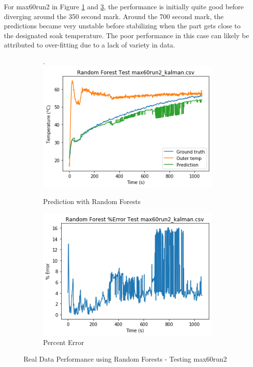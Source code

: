 For max60run2 in Figure \ref{rf602} and \ref{rf602err}, the performance is initially quite good before diverging around the 350 second mark. Around the 700 second mark, the predictions became very unstable before stabilizing when the part gets close to the designated soak temperature. The poor performance in this case can likely be attributed to over-fitting due to a lack of variety in data. 

\begin{figure}[ht]
    \begin{subfigure}{.5\linewidth}.
        \centering
    	\includegraphics[width=\linewidth]{other/RF_prediction_real2.png}
        \caption{Prediction with Random Forests}
        \label{rf602}
    \end{subfigure}
    \begin{subfigure}{.5\linewidth}
    	\centering
    	\includegraphics[width=\linewidth]{other/RF_error_real2.png}
        \caption{Percent Error}
        \label{rf602err}
    \end{subfigure}
    \caption{Real Data Performance using Random Forests - Testing max60run2}
\end{figure}

